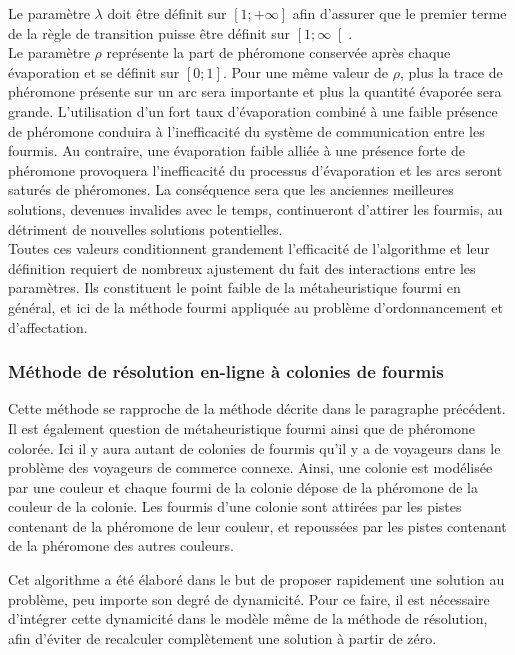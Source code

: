Le paramètre $\lambda$ doit être définit sur $\left[1;+\infty\right]$ afin d'assurer que le premier terme de la règle de transition puisse être définit sur $\left[1;\infty\right[$.\\

Le paramètre $\rho$ représente la part de phéromone conservée après chaque évaporation et se définit sur $\left[0;1\right]$. Pour une même valeur de $\rho$, plus la trace de phéromone présente sur un arc sera importante et plus la quantité évaporée sera grande. L'utilisation d'un fort taux d'évaporation combiné à une faible présence de phéromone conduira à l'inefficacité du système de communication entre les fourmis. Au contraire, une évaporation faible alliée à une présence forte de phéromone provoquera l'inefficacité du processus d'évaporation et les arcs seront saturés de phéromones. La conséquence sera que les anciennes meilleures solutions, devenues invalides avec le temps, continueront d'attirer les fourmis, au détriment de nouvelles solutions potentielles.\\

Toutes ces valeurs conditionnent grandement l'efficacité de l'algorithme et leur définition requiert de nombreux ajustement du fait des interactions entre les paramètres. Ils constituent le point faible de la métaheuristique fourmi en général, et ici de la méthode fourmi appliquée au problème d'ordonnancement et d'affectation.

\subsubsection{Méthode de résolution en-ligne à colonies de fourmis}\label{chap:ordo:reso:onlineACO}

Cette méthode se rapproche de la méthode décrite dans le paragraphe précédent. Il est également question de métaheuristique fourmi ainsi que de phéromone colorée. Ici il y aura autant de colonies de fourmis qu'il y a de voyageurs dans le problème des voyageurs de commerce connexe. Ainsi, une colonie est modélisée par une couleur et chaque fourmi de la colonie dépose de la phéromone de la couleur de la colonie. Les fourmis d'une colonie sont attirées par les pistes contenant de la phéromone de leur couleur, et repoussées par les pistes contenant de la phéromone des autres couleurs. 

Cet algorithme a été élaboré dans le but de proposer rapidement une solution au problème, peu importe son degré de dynamicité. Pour ce faire, il est nécessaire d'intégrer cette dynamicité dans le modèle même de la méthode de résolution, afin d'éviter de recalculer complètement une solution à partir de zéro.

